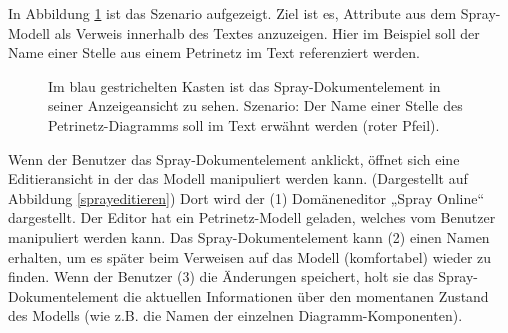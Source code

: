  
In Abbildung \ref{sprayanzeigen} ist das Szenario aufgezeigt. Ziel ist es, Attribute aus dem Spray-Modell als Verweis innerhalb des Textes anzuzeigen. Hier im Beispiel soll der Name einer Stelle aus einem Petrinetz im Text referenziert werden.

 
\begin{figure}[h!]
\centering
\advance\leftskip-2.5cm
\caption[Spray-Dokumentelement Repräsentation]{ Im blau gestrichelten Kasten ist das Spray-Dokumentelement in seiner Anzeigeansicht zu sehen. Szenario: Der Name einer Stelle des Petrinetz-Diagramms soll im Text erwähnt werden (roter Pfeil). }\label{sprayanzeigen}
\end{figure}
 
Wenn der Benutzer das Spray-Dokumentelement anklickt, öffnet sich eine Editieransicht in der das Modell manipuliert werden kann. (Dargestellt auf Abbildung \ref{sprayeditieren}) Dort wird der (1) Domäneneditor „Spray Online“ dargestellt. Der Editor hat ein Petrinetz-Modell geladen, welches vom Benutzer manipuliert werden kann. Das Spray-Dokumentelement kann (2) einen Namen erhalten, um es später beim Verweisen auf das Modell (komfortabel) wieder zu finden. Wenn der Benutzer (3) die Änderungen speichert, holt sie das Spray-Dokumentelement die aktuellen Informationen über den momentanen Zustand des Modells (wie z.B. die Namen der einzelnen Diagramm-Komponenten).

